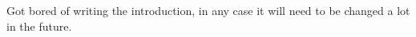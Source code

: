\ac{Got bored of writing the introduction, in any case it will need to be 
changed a lot in the future.}

